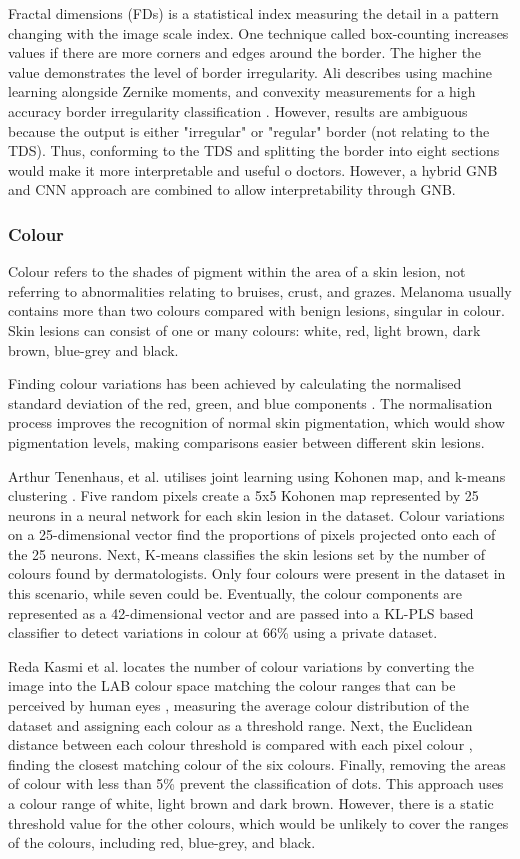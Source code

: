 \documentclass[10.5pt]{report}
\begin{document}
Fractal dimensions (FDs) is a statistical index measuring the detail in a pattern changing with the image scale index. One technique called box-counting increases values if there are more corners and edges around the border. The higher the value demonstrates the level of border irregularity. Ali describes using machine learning alongside Zernike moments, and convexity measurements for a high accuracy border irregularity classification \cite{Ali2020b}. However, results are ambiguous because the output is either "irregular" or "regular" border (not relating to the TDS). Thus, conforming to the TDS and splitting the border into eight sections would make it more interpretable and useful o doctors. However, a hybrid GNB and CNN approach are combined to allow interpretability through GNB.

\subsubsection{Colour}
Colour refers to the shades of pigment within the area of a skin lesion, not referring to abnormalities relating to bruises, crust, and grazes. Melanoma usually contains more than two colours compared with benign lesions, singular in colour. Skin lesions can consist of one or many colours: white, red, light brown, dark brown, blue-grey and black.

Finding colour variations has been achieved by calculating the normalised standard deviation of the red, green, and blue components \cite{She2007}. The normalisation process improves the recognition of normal skin pigmentation, which would show pigmentation levels, making comparisons easier between different skin lesions.

Arthur Tenenhaus, et al. utilises joint learning using Kohonen map, and k-means clustering \cite{Tenenhaus2010}. Five random pixels create a 5x5 Kohonen map represented by 25 neurons in a neural network for each skin lesion in the dataset. Colour variations on a 25-dimensional vector find the proportions of pixels projected onto each of the 25 neurons. Next, K-means classifies the skin lesions set by the number of colours found by dermatologists. Only four colours were present in the dataset in this scenario, while seven could be. Eventually, the colour components are represented as a 42-dimensional vector and are passed into a KL-PLS based classifier to detect variations in colour at 66\% using a private dataset.

Reda Kasmi et al. locates the number of colour variations by converting the image into the LAB colour space matching the colour ranges that can be perceived by human eyes \cite{Myridis2014a}, measuring the average colour distribution of the dataset and assigning each colour as a threshold range. Next, the Euclidean distance between each colour threshold is compared with each pixel colour  \cite{Kasmi2016a}, finding the closest matching colour of the six colours. Finally, removing the areas of colour with less than 5\% prevent the classification of dots. This approach uses a colour range of white, light brown and dark brown. However, there is a static threshold value for the other colours, which would be unlikely to cover the ranges of the colours, including red, blue-grey, and black.
\end{document}
